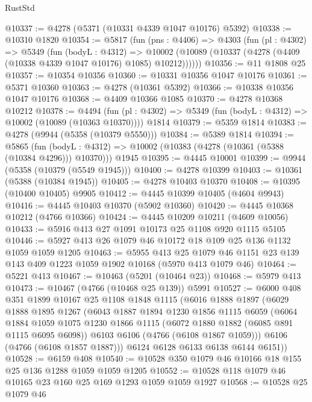 \begin{lexlean}{RustStd}
\begin{coremodule}
{\begin{coremodule}
{{{{{{{{{{{{{{{{{{{{{{{{{{{{{{{{{{{@10337 := @4278 (@5371 (@10331 @4339 @1047 @10176) @5392)
@10338 := @10310 @1820
@10354 := @5817
    (fun (pns : @4406) =>
    @4303
      (fun (pl : @4302) =>
      @5349
        (fun (bodyL : @4312) =>
        @10002 (@10089 (@10337 (@4278 (@4409 (@10338 @4339 @1047 @10176) @1085) @10212))))))
@10356 := @11 @1808 @25
@10357 := @10354 @10356
@10360 := @10331 @10356 @1047 @10176
@10361 := @5371 @10360
@10363 := @4278 (@10361 @5392)
@10366 := @10338 @10356 @1047 @10176
@10368 := @4409 @10366 @1085
@10370 := @4278 @10368 @10212
@10378 := @4494
    (fun (pl : @4302) => @5349 (fun (bodyL : @4312) => @10002 (@10089 (@10363 @10370))))
    @1814
@10379 := @5359 @1814
@10383 := @4278 (@9944 (@5358 (@10379 @5550)))
@10384 := @5389 @1814
@10394 := @5865
    (fun (bodyL : @4312) => @10002 (@10383 (@4278 (@10361 (@5388 (@10384 @4296))) @10370)))
    @1945
@10395 := @4445 @10001
@10399 := @9944 (@5358 (@10379 (@5549 @1945)))
@10400 := @4278 @10399
@10403 := @10361 (@5388 (@10384 @1945))
@10405 := @4278 @10403 @10370
@10408 := @10395 (@10400 @10405) @9905
@10412 := @4445 @10399 @10405 (@4604 @9943)
@10416 := @4445 @10403 @10370 (@5902 @10360)
@10420 := @4445 @10368 @10212 (@4766 @10366)
@10424 := @4445 @10209 @10211 (@4609 @10056)
@10433 := @5916 @413 @27 @1091 @10173 @25 @1108 @920 @1115 @5105
@10446 := @5927 @413 @26 @1079 @46 @10172 @18 @109 @25 @136 @1132 @1059 @1059 @1205
@10463 := @5955
    @413
    @25
    @1079
    @46
    @1151
    @23
    @139
    @143
    @409
    @1223
    @1059
    @1902
    @10168
    (@5970 @413 @1079 @46)
@10464 := @5221 @413
@10467 := @10463 (@5201 (@10464 @23))
@10468 := @5979 @413
@10473 := @10467 (@4766 (@10468 @25 @139)) @5991
@10527 := @6000
    @408
    @351
    @1899
    @10167
    @25
    @1108
    @1848
    @1115
    (@6016
      @1888
      @1897
      (@6029
        @1888
        @1895
        @1267
        (@6043
          @1887
          @1894
          @1230
          @1856
          @1115
          @6059
          (@6064
            @1884
            @1059
            @1075
            @1230
            @1866
            @1115
            (@6072 @1880 @1882 (@6085 @891 @1115 @6095 @6098))
            @6103
            @6106
            (@4766 (@6108 @1867 @1059)))
          @6106
          (@4766 (@6108 @1857 @1887)))
        @6124
        @6128
        @6133
        @6138
        @6144
        @6151))
@10528 := @6159 @408
@10540 := @10528 @350 @1079 @46 @10166 @18 @155 @25 @136 @1288 @1059 @1059 @1205
@10552 := @10528 @118 @1079 @46 @10165 @23 @160 @25 @169 @1293 @1059 @1059 @1927
@10568 := @10528
    @25
    @1079
    @46
}}}}}}}}}}}}}}}}}}}}}}}}}}}}}}}}}}}
\end{coremodule}}
\end{coremodule}
\end{lexlean}
